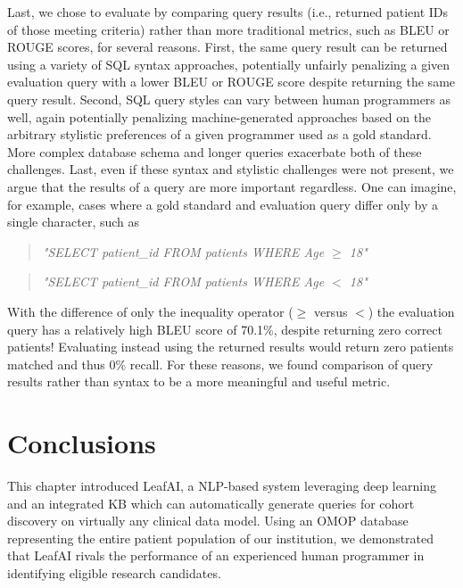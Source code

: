 \documentclass[../main.tex]{subfiles}
\begin{document}
Last, we chose to evaluate by comparing query results (i.e., returned patient IDs of those meeting criteria) rather than more traditional metrics, such as BLEU or ROUGE scores, for several reasons. First, the same query result can be returned using a variety of SQL syntax approaches, potentially unfairly penalizing a given evaluation query with a lower BLEU or ROUGE score despite returning the same query result. Second, SQL query styles can vary between human programmers as well, again potentially penalizing machine-generated approaches based on the arbitrary stylistic preferences of a given programmer used as a gold standard. More complex database schema and longer queries exacerbate both of these challenges. Last, even if these syntax and stylistic challenges were not present, we argue that the results of a query are more important regardless. One can imagine, for example, cases where a gold standard and evaluation query differ only by a single character, such as 

\begin{quote} 
\centering 
    \textit{"SELECT patient\_id FROM patients WHERE Age \textbf{$\geq$} 18"}
\end{quote}

\begin{quote} 
\centering 
    \textit{"SELECT patient\_id FROM patients WHERE Age \textbf{$<$} 18"}
\end{quote}

\noindent With the difference of only the inequality operator ($\geq$ versus $<$) the evaluation query has a relatively high BLEU score of 70.1\%, despite returning zero correct patients! Evaluating instead using the returned results would return zero patients matched and thus 0\% recall. For these reasons, we found comparison of query results rather than syntax to be a more meaningful and useful metric.

\section{Conclusions}

This chapter introduced LeafAI, a NLP-based system leveraging deep learning and an integrated KB which can automatically generate queries for cohort discovery on virtually any clinical data model. Using an OMOP database representing the entire patient population of our institution, we demonstrated that LeafAI rivals the  performance of an experienced human programmer in identifying eligible research candidates.
\end{document}
